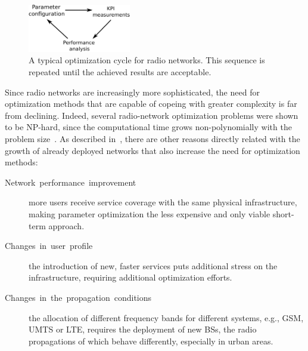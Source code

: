 \begin{figure}[h]
\centering

\includegraphics[width=0.4\textwidth]{02-background_and_motivation/img/optimization_cycle}

\caption{A typical optimization cycle for radio networks. This sequence is
repeated until the achieved results are acceptable. \label{fig:Optimization-cycle}}
\end{figure}


\bigskip{}


Since radio networks are increasingly more sophisticated, the need
for optimization methods that are capable of copeing with greater
complexity is far from declining. Indeed, several radio-network optimization
problems were shown to be NP-hard, since the computational time grows
non-polynomially with the problem size~\cite{Amaldi-Planning_UMTS_base_station_locations:2003,Amaldi-Radio_planning_and_coverage_optimization_of_3G_networks:2008,Gordejuela-LTE_access_network_planning_and_optimization:2009,Han-Optimizing_cell_size_for_energy_saving_in_cellular_networks:2012,Lee-Proportional_fair_frequency_domain_packet_scheduling_for_LTE_uplink:2009,Razavi-Performance_improvement_of_LTE_tracking_area_design:2008,Siomina-Minimum_pilot_power_for_service_coverage:2007}.
As described in~\cite{Nawrocki-Understanding_UMTS_radio_network_modelling_and_optimisation:2006},
there are other reasons directly related with the growth of already
deployed networks that also increase the need for optimization methods:
\begin{description}
\item [{Network~performance~improvement}] more users receive service
coverage with the same physical infrastructure, making parameter optimization
the less expensive and only viable short-term approach.
\item [{Changes~in~user~profile}] the introduction of new, faster services
puts additional stress on the infrastructure, requiring additional
optimization efforts.
\item [{Changes~in~the~propagation~conditions}] the allocation of different
frequency bands for different systems, e.g., GSM, UMTS or LTE, requires
the deployment of new BSs, the radio propagations of which behave
differently, especially in urban areas.
\end{description}
